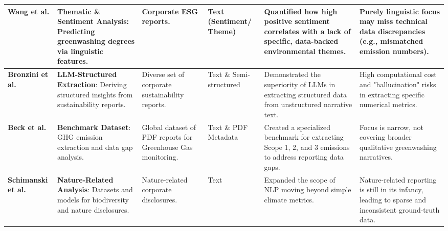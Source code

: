 \documentclass[english, online, cse, master]{dithesis}
\begin{document}
\begin{landscape}
\begin{table}[p]
\begin{tabularx}{\linewidth}{|p{1.8cm}|X|X|p{1.8cm}|X|X|}
\textbf{Wang et al.}  \parencite{xiaojia_wang_02351a60} & \textbf{Thematic \& Sentiment Analysis}: Predicting greenwashing degrees via linguistic features. & Corporate ESG reports. & Text (Sentiment/ Theme) & Quantified how high positive sentiment correlates with a lack of specific, data-backed environmental themes. & Purely linguistic focus may miss technical data discrepancies (e.g., mismatched emission numbers). \\ \hline
\textbf{Bronzini et al.}  \parencite{marco_bronzini_bf94d949} & \textbf{LLM-Structured Extraction}: Deriving structured insights from sustainability reports. & Diverse set of corporate sustainability reports. & Text \& Semi-structured & Demonstrated the superiority of LLMs in extracting structured data from unstructured narrative text. & High computational cost and "hallucination" risks in extracting specific numerical metrics. \\ \hline
\textbf{Beck et al.}  \parencite{jacob_beck_9548a833} & \textbf{Benchmark Dataset}: GHG emission extraction and data gap analysis. & Global dataset of PDF reports for Greenhouse Gas monitoring. & Text \& PDF Metadata & Created a specialized benchmark for extracting Scope 1, 2, and 3 emissions to address reporting data gaps. & Focus is narrow, not covering broader qualitative greenwashing narratives. \\ \hline
\textbf{Schimanski et al.}  \parencite{tobias_schimanski_3549ff9f} & \textbf{Nature-Related Analysis}: Datasets and models for biodiversity and nature disclosures. & Nature-related corporate disclosures. & Text & Expanded the scope of NLP moving beyond simple climate metrics. & Nature-related reporting is still in its infancy, leading to sparse and inconsistent ground-truth data. \\ \hline
\end{tabularx}
\end{table}
\end{landscape}
\end{document}
